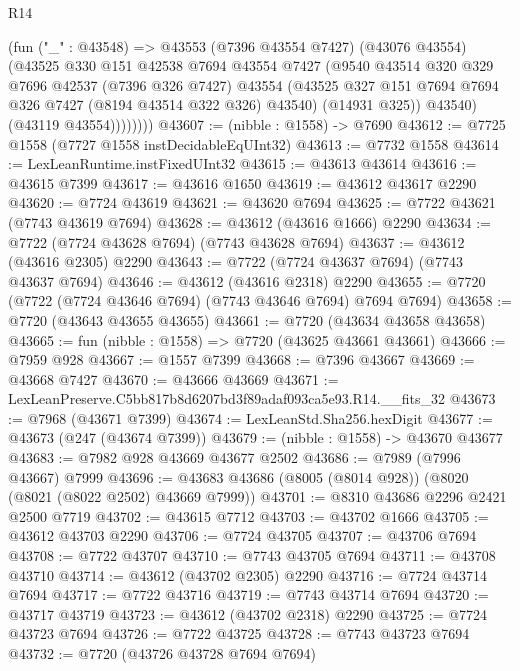 \begin{lexlean}{R14}
\begin{coremodule}
                (fun ("_" : @43548) =>
                @43553
                  (@7396 @43554 @7427)
                  (@43076 @43554)
                  (@43525
                    @330
                    @151
                    @42538
                    @7694
                    @43554
                    @7427
                    (@9540
                      @43514
                      @320
                      @329
                      @7696
                      @42537
                      (@7396 @326 @7427)
                      @43554
                      (@43525 @327 @151 @7694 @7694 @326 @7427 (@8194 @43514 @322 @326) @43540)
                      (@14931 @325))
                    @43540)
                  (@43119 @43554))))))))
@43607 := (nibble : @1558) -> @7690
@43612 := @7725 @1558 (@7727 @1558 instDecidableEqUInt32)
@43613 := @7732 @1558
@43614 := LexLeanRuntime.instFixedUInt32
@43615 := @43613 @43614
@43616 := @43615 @7399
@43617 := @43616 @1650
@43619 := @43612 @43617 @2290
@43620 := @7724 @43619
@43621 := @43620 @7694
@43625 := @7722 @43621 (@7743 @43619 @7694)
@43628 := @43612 (@43616 @1666) @2290
@43634 := @7722 (@7724 @43628 @7694) (@7743 @43628 @7694)
@43637 := @43612 (@43616 @2305) @2290
@43643 := @7722 (@7724 @43637 @7694) (@7743 @43637 @7694)
@43646 := @43612 (@43616 @2318) @2290
@43655 := @7720 (@7722 (@7724 @43646 @7694) (@7743 @43646 @7694) @7694 @7694)
@43658 := @7720 (@43643 @43655 @43655)
@43661 := @7720 (@43634 @43658 @43658)
@43665 := fun (nibble : @1558) => @7720 (@43625 @43661 @43661)
@43666 := @7959 @928
@43667 := @1557 @7399
@43668 := @7396 @43667
@43669 := @43668 @7427
@43670 := @43666 @43669
@43671 := LexLeanPreserve.C5bb817b8d6207bd3f89adaf093ca5e93.R14.__fits_32
@43673 := @7968 (@43671 @7399)
@43674 := LexLeanStd.Sha256.hexDigit
@43677 := @43673 (@247 (@43674 @7399))
@43679 := (nibble : @1558) -> @43670 @43677
@43683 := @7982 @928 @43669 @43677 @2502
@43686 := @7989 (@7996 @43667) @7999
@43696 := @43683 @43686 (@8005 (@8014 @928)) (@8020 (@8021 (@8022 @2502) @43669 @7999))
@43701 := @8310 @43686 @2296 @2421 @2500 @7719
@43702 := @43615 @7712
@43703 := @43702 @1666
@43705 := @43612 @43703 @2290
@43706 := @7724 @43705
@43707 := @43706 @7694
@43708 := @7722 @43707
@43710 := @7743 @43705 @7694
@43711 := @43708 @43710
@43714 := @43612 (@43702 @2305) @2290
@43716 := @7724 @43714 @7694
@43717 := @7722 @43716
@43719 := @7743 @43714 @7694
@43720 := @43717 @43719
@43723 := @43612 (@43702 @2318) @2290
@43725 := @7724 @43723 @7694
@43726 := @7722 @43725
@43728 := @7743 @43723 @7694
@43732 := @7720 (@43726 @43728 @7694 @7694)

\end{coremodule}
\end{lexlean}
